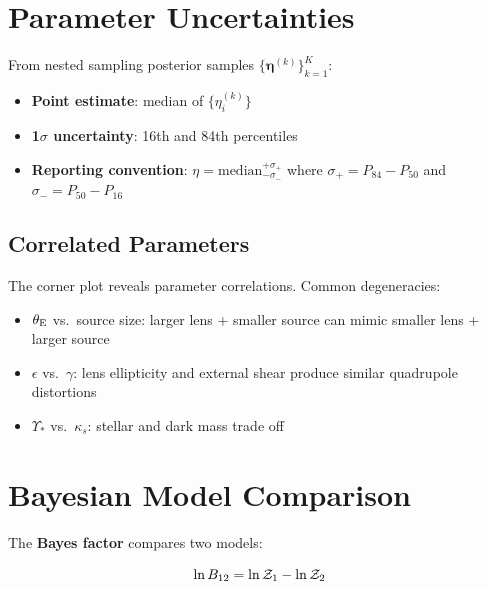 \documentclass[11pt, letterpaper]{article}
\begin{document}
\section{Parameter Uncertainties}

From nested sampling posterior samples $\{\bm{\eta}^{(k)}\}_{k=1}^K$:

\begin{itemize}[nosep]
  \item \textbf{Point estimate}: median of $\{\eta_i^{(k)}\}$
  \item \textbf{1$\sigma$ uncertainty}: 16th and 84th percentiles
  \item \textbf{Reporting convention}:
    $\eta = \text{median}^{+\sigma_+}_{-\sigma_-}$
    where $\sigma_+ = P_{84} - P_{50}$ and $\sigma_- = P_{50} - P_{16}$
\end{itemize}

\subsection{Correlated Parameters}

The corner plot reveals parameter correlations. Common degeneracies:
\begin{itemize}[nosep]
  \item $\theta_{\rm E}$ vs.\ source size: larger lens + smaller source can mimic
    smaller lens + larger source
  \item $\epsilon$ vs.\ $\gamma$: lens ellipticity and external shear
    produce similar quadrupole distortions
  \item $\Upsilon_*$ vs.\ $\kappa_s$: stellar and dark mass trade off
\end{itemize}

\section{Bayesian Model Comparison}

The \textbf{Bayes factor} compares two models:
\begin{keyresult}
\begin{equation}
\ln B_{12} = \ln\mathcal{Z}_1 - \ln\mathcal{Z}_2
\label{eq:bayes-factor}
\end{equation}
\end{keyresult}
\end{document}
